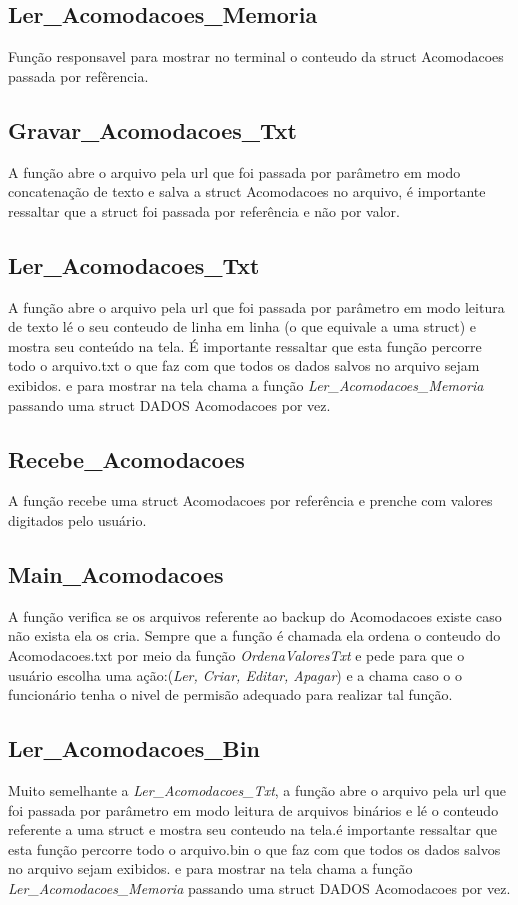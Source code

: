 \documentclass{article}
\begin{document}
\subsection{Ler\_Acomodacoes\_Memoria}
	Função responsavel para mostrar no terminal o conteudo da struct Acomodacoes passada por  refêrencia.

\subsection{Gravar\_Acomodacoes\_Txt}
	A função abre o arquivo pela url que foi passada por parâmetro em modo concatenação de texto e salva a struct Acomodacoes  no arquivo, é importante ressaltar que  a struct foi passada por referência e não por valor.

\subsection{Ler\_Acomodacoes\_Txt}
	A função abre o arquivo pela url que foi passada por parâmetro em modo leitura de texto lé o seu conteudo de linha em linha (o que equivale a uma struct) e mostra seu conteúdo na tela. É importante ressaltar que esta função percorre todo o arquivo.txt o que faz com que todos os dados salvos no arquivo sejam exibidos. e para mostrar na tela chama a função \textit{Ler\_Acomodacoes\_Memoria} passando uma struct DADOS Acomodacoes  por vez.

\subsection{Recebe\_Acomodacoes}
	A função recebe uma struct  Acomodacoes por referência e prenche com valores digitados pelo usuário.

\subsection{Main\_Acomodacoes}
	A função verifica se os arquivos referente ao backup do Acomodacoes existe caso não exista ela os cria. Sempre que a função é chamada ela ordena o conteudo do Acomodacoes.txt por meio da função \textit{OrdenaValoresTxt} e pede para que o usuário escolha uma ação:(\textit{Ler, Criar, Editar, Apagar})  e a chama caso o  o funcionário tenha o nivel de permisão adequado para realizar tal função.

\subsection{Ler\_Acomodacoes\_Bin}
	Muito semelhante a \textit{Ler\_Acomodacoes\_Txt}, a função abre o arquivo pela url que foi passada por parâmetro em modo leitura de arquivos binários e lé o conteudo referente a uma struct e mostra seu conteudo na tela.é importante ressaltar que esta função percorre todo o arquivo.bin o que faz com que todos os dados salvos no arquivo sejam exibidos. e para mostrar na tela chama a função \textit{Ler\_Acomodacoes\_Memoria} passando uma struct DADOS Acomodacoes  por vez.
\end{document}
